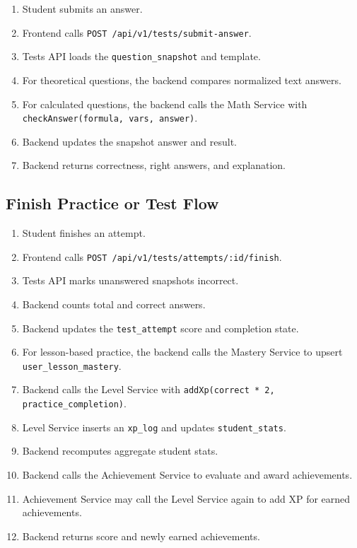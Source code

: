 \documentclass[11pt,a4paper]{article}
\newcommand{\docpath}[1]{\texttt{#1}}
\begin{document}
\begin{enumerate}[leftmargin=1.5em]
  \item Student submits an answer.
  \item Frontend calls \docpath{POST /api/v1/tests/submit-answer}.
  \item Tests API loads the \docpath{question\_snapshot} and template.
  \item For theoretical questions, the backend compares normalized text answers.
  \item For calculated questions, the backend calls the Math Service with \docpath{checkAnswer(formula, vars, answer)}.
  \item Backend updates the snapshot answer and result.
  \item Backend returns correctness, right answers, and explanation.
\end{enumerate}

\subsection{Finish Practice or Test Flow}

\begin{enumerate}[leftmargin=1.5em]
  \item Student finishes an attempt.
  \item Frontend calls \docpath{POST /api/v1/tests/attempts/:id/finish}.
  \item Tests API marks unanswered snapshots incorrect.
  \item Backend counts total and correct answers.
  \item Backend updates the \docpath{test\_attempt} score and completion state.
  \item For lesson-based practice, the backend calls the Mastery Service to upsert \docpath{user\_lesson\_mastery}.
  \item Backend calls the Level Service with \docpath{addXp(correct * 2, practice\_completion)}.
  \item Level Service inserts an \docpath{xp\_log} and updates \docpath{student\_stats}.
  \item Backend recomputes aggregate student stats.
  \item Backend calls the Achievement Service to evaluate and award achievements.
  \item Achievement Service may call the Level Service again to add XP for earned achievements.
  \item Backend returns score and newly earned achievements.
\end{enumerate}
\end{document}
